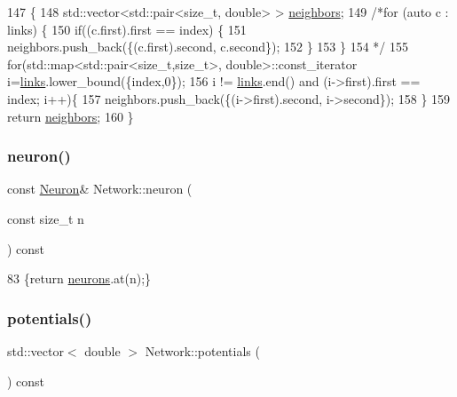 \begin{DoxyCode}
147 \{
148     std::vector<std::pair<size\_t, double> > \hyperlink{classNetwork_abf7324fe99e691cb9b06247e5e5013fd}{neighbors};
149     \textcolor{comment}{/*for (auto c : links) \{}
150 \textcolor{comment}{        if((c.first).first == index) \{}
151 \textcolor{comment}{            neighbors.push\_back(\{(c.first).second, c.second\});}
152 \textcolor{comment}{        \}}
153 \textcolor{comment}{    \}}
154 \textcolor{comment}{    */}
155     \textcolor{keywordflow}{for}(std::map<std::pair<size\_t,size\_t>, \textcolor{keywordtype}{double}>::const\_iterator i=\hyperlink{classNetwork_aef1609a9a6b865651417ce995b4575a8}{links}.lower\_bound(\{index,0\});
156     i != \hyperlink{classNetwork_aef1609a9a6b865651417ce995b4575a8}{links}.end() and (i->first).first == index; i++)\{
157         neighbors.push\_back(\{(i->first).second, i->second\});
158     \}
159     \textcolor{keywordflow}{return} \hyperlink{classNetwork_abf7324fe99e691cb9b06247e5e5013fd}{neighbors};
160 \}
\end{DoxyCode}
\mbox{\label{classNetwork_a4639c4fd24bc6dc807ae35af6577ed7f}} 
\subsubsection{\texorpdfstring{neuron()}{neuron()}}
{\footnotesize\ttfamily const \hyperlink{classNeuron}{Neuron}\& Network\+::neuron (\begin{DoxyParamCaption}\item[{const size\+\_\+t}]{n }\end{DoxyParamCaption}) const\hspace{0.3cm}{\ttfamily [inline]}}


\begin{DoxyCode}
83 \{\textcolor{keywordflow}{return} \hyperlink{classNetwork_a1b7832bc2c7b8855cdc3b2d6329eff9d}{neurons}.at(n);\}
\end{DoxyCode}
\mbox{\label{classNetwork_a44d9c341bfec26cb37efe3c29fd7a103}} 
\subsubsection{\texorpdfstring{potentials()}{potentials()}}
{\footnotesize\ttfamily std\+::vector$<$ double $>$ Network\+::potentials (\begin{DoxyParamCaption}{ }\end{DoxyParamCaption}) const}



